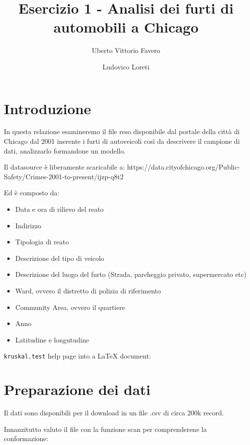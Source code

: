 \documentclass{article}
\title{Esercizio 1 - Analisi dei furti di automobili a Chicago}
\author[1,2]{Uberto Vittorio Favero}
\author[1,3]{Ludovico Loreti}
\affil[1]{Università di Bologna}
\affil[2]{Statistica Numerica}
\begin{document}


\maketitle

\section{Introduzione}

In questa relazione esamineremo il file reso disponibile dal portale della città di Chicago dal 2001 inerente i furti di autoveicoli
così da descrivere il campione di dati, analizzarlo formandone un modello.

Il datasource è liberamente scaricabile a:
https://data.cityofchicago.org/Public-Safety/Crimes-2001-to-present/ijzp-q8t2

Ed è composto da:

\begin{itemize}
\item Data e ora di rilievo del reato
\item Indirizzo
\item Tipologia di reato
\item Descrizione del tipo di veicolo
\item Descrizione del luogo del furto (Strada, parcheggio privato, supermercato etc)
\item Ward, ovvero il distretto di polizia di riferimento
\item Community Area, ovvero il quartiere
\item Anno
\item Latitudine e longutudine
\end{itemize}
\texttt{kruskal.test} help page into a \LaTeX{} document:

\newpage

\section{Preparazione dei dati}

Il dati sono disponibili per il download in un file .csv di circa 200k record.

Innanzitutto valuto il file con la funzione scan per comprenderene la conformazione:
\end{document}
